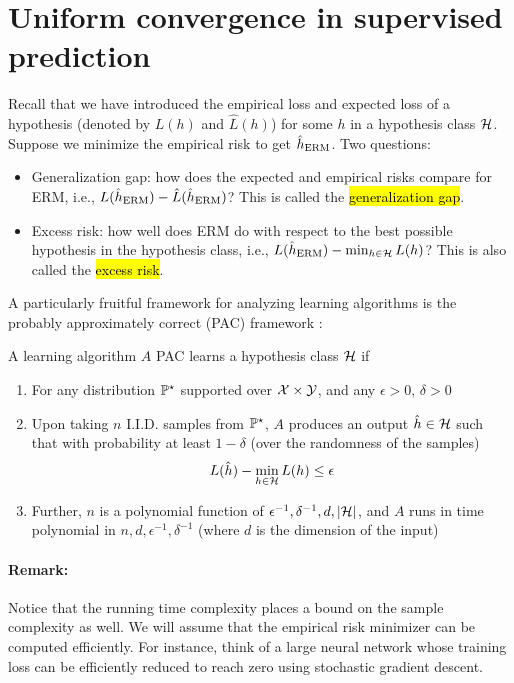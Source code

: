 \section{Uniform convergence in supervised prediction}

Recall that we have introduced the empirical loss and expected loss of a hypothesis (denoted by $L(h)$ and $\hat L(h)$) for some $h$ in a hypothesis class $\mathcal{H}$.
Suppose we minimize the empirical risk to get $\hat h_{\textup{ERM}}$. Two questions:
\begin{itemize}
    \item Generalization gap: how does the expected and empirical risks compare for ERM, i.e., $L(\hat h_{\textup{ERM}}) - \hat L(\hat h_{\textup{ERM}})$? This is called the \hl{generalization gap}.

    \item Excess risk: how well does ERM do with respect to the best possible hypothesis in the hypothesis class, i.e., $L(\hat h_{\textup{ERM}}) - \min_{h \in \mathcal{H}} L(h)$?
    This is also called the \hl{excess risk}.
\end{itemize}

A particularly fruitful framework for analyzing learning algorithms is the probably approximately correct (PAC) framework \citep{valiant1984theory}:

\begin{mdframed}[
    roundcorner=10pt,
    leftmargin=0.1\textwidth,
    rightmargin=0.1\textwidth]
    A learning algorithm $A$ PAC learns a hypothesis class $\mathcal{H}$ if
    \begin{enumerate}[label=\alph*)]
        \item For any distribution $\mathbb{P}^{\star}$ supported over $\mathcal{X} \times \mathcal{Y}$, and any $\epsilon > 0$, $\delta > 0$
        \item Upon taking $n$ I.I.D. samples from $\mathbb{P}^{\star}$, $A$ produces an output $\hat h \in \mathcal{H}$ such that with probability at least $1 - \delta$ (over the randomness of the samples)
        \[ L(\hat h) - \min_{h \in \mathcal{H}} L(h) \le \epsilon \]
        \item Further, $n$ is a polynomial function of $\epsilon^{-1}, \delta^{-1}, d, \left\lvert\mathcal{H}\right\rvert$, and $A$ runs in time polynomial in $n, d, \epsilon^{-1}, \delta^{-1}$ (where $d$ is the dimension of the input)
    \end{enumerate}
\end{mdframed}

\paragraph{Remark:} Notice that the running time complexity places a bound on the sample complexity as well. We will assume that the empirical risk minimizer can be computed efficiently.
For instance, think of a large neural network whose training loss can be efficiently reduced to reach zero using stochastic gradient descent.

